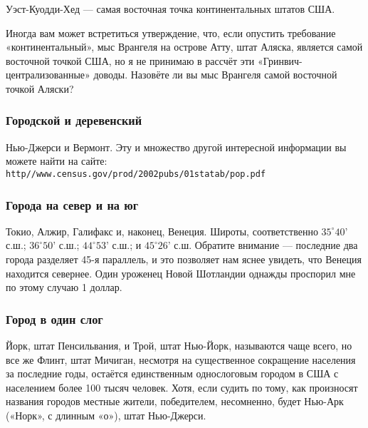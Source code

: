 Уэст-Куодди-Хед %
--- самая восточная точка континентальных штатов США.\heart
                            


Иногда вам может встретиться утверждение, что, если опустить требование «континентальный», мыс Врангеля %
на острове Атту, %
штат Аляска, является самой восточной точкой США, но я не принимаю в рассчёт эти «Гринвич-централизованные» доводы. 
Назовёте ли вы мыс Врангеля самой восточной точкой Аляски?




\subsubsection*{Городской и деревенский}%


Нью-Джерси и Вермонт. Эту и множество другой интересной информации вы можете найти на сайте:\\
\texttt{http//www.census.gov/prod/2002pubs/01statab/pop.pdf} 
 \heart                          




\subsubsection*{Города на север и на юг}%


Токио, Алжир, Галифакс и, наконец, Венеция. Широты, соответственно
$35^\circ 40’$ с.ш.; $36^\circ 50’$ с.ш.; $44^\circ 53’$ с.ш.; и $45^\circ 26’$ с.ш. 
Обратите внимание --- последние два города разделяет 45-я параллель, и это позволяет нам яснее увидеть, что Венеция находится севернее. Один уроженец Новой Шотландии однажды проспорил мне по этому случаю 1 доллар.%
\heart




\subsubsection*{Город в один слог}%


Йорк, штат Пенсильвания, и Трой, штат Нью-Йорк, называются чаще всего, но все же Флинт, штат Мичиган, несмотря на существенное сокращение населения за последние годы, остаётся единственным однослоговым городом в США с населением более 100 тысяч человек.
Хотя, если судить по тому, как произносят названия городов местные жители, победителем, несомненно, будет Нью-Арк («Норк», с длинным «о»), штат Нью-Джерси. \heart






